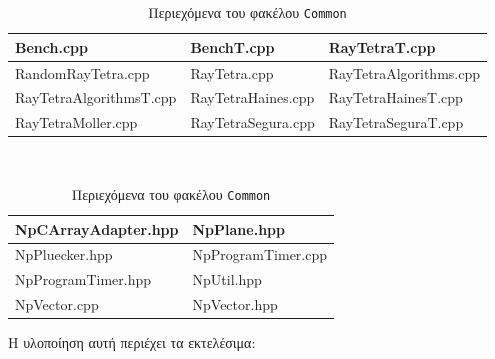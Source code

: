 \begin{table}[h!]
\centering
\caption{Περιεχόμενα του φακέλου \texttt{RayTetra}}
\label{Raytetra_contents}
\begin{tabular}{|l|l|l|}
\hline
Bench.cpp & BenchT.cpp & RayTetraT.cpp  \\ \hline
RandomRayTetra.cpp & RayTetra.cpp & RayTetraAlgorithms.cpp \\ \hline RayTetraAlgorithmsT.cpp & RayTetraHaines.cpp & RayTetraHainesT.cpp \\ \hline
RayTetraMoller.cpp & RayTetraSegura.cpp & RayTetraSeguraT.cpp \\ \hline
\end{tabular}\\[0.5cm]

\caption{Περιεχόμενα του φακέλου \texttt{Common}}
\label{Common_contents}
\begin{tabular}{|l|l|}
\hline
NpCArrayAdapter.hpp & NpPlane.hpp   \\ \hline
NpPluecker.hpp & NpProgramTimer.cpp \\ \hline
NpProgramTimer.hpp & NpUtil.hpp \\ \hline
NpVector.cpp & NpVector.hpp \\ \hline
\end{tabular}
\end{table}


Η υλοποίηση αυτή περιέχει τα εκτελέσιμα:

